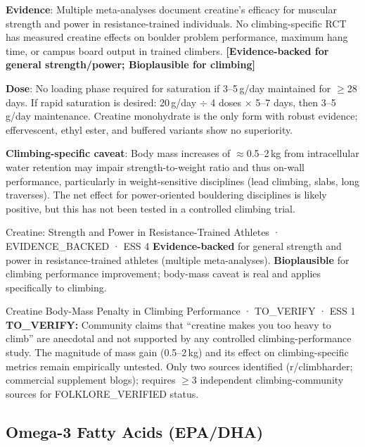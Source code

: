\textbf{Evidence}: Multiple meta-analyses document creatine's efficacy for muscular strength and power in resistance-trained individuals. No climbing-specific RCT has measured creatine effects on boulder problem performance, maximum hang time, or campus board output in trained climbers. \textbf{[Evidence-backed for general strength/power; Bioplausible for climbing]}

\textbf{Dose}: No loading phase required for saturation if 3--5\,g/day maintained for $\geq$28 days. If rapid saturation is desired: 20\,g/day $\div$ 4 doses $\times$ 5--7 days, then 3--5\,g/day maintenance. Creatine monohydrate is the only form with robust evidence; effervescent, ethyl ester, and buffered variants show no superiority.

\textbf{Climbing-specific caveat}: Body mass increases of ${\approx}$0.5--2\,kg from intracellular water retention may impair strength-to-weight ratio and thus on-wall performance, particularly in weight-sensitive disciplines (lead climbing, slabs, long traverses). The net effect for power-oriented bouldering disciplines is likely positive, but this has not been tested in a controlled climbing trial.

\begin{evidencebox}{Creatine: Strength and Power in Resistance-Trained Athletes · EVIDENCE\_BACKED · ESS 4}
\textbf{Evidence-backed} for general strength and power in resistance-trained athletes (multiple meta-analyses). \textbf{Bioplausible} for climbing performance improvement; body-mass caveat is real and applies specifically to climbing.
\end{evidencebox}

\begin{toverifybox}{Creatine Body-Mass Penalty in Climbing Performance · TO\_VERIFY · ESS 1}
\textbf{TO\_VERIFY:} Community claims that ``creatine makes you too heavy to climb'' are anecdotal and not supported by any controlled climbing-performance study. The magnitude of mass gain (0.5--2\,kg) and its effect on climbing-specific metrics remain empirically untested. Only two sources identified (r/climbharder; commercial supplement blogs); requires $\geq$3 independent climbing-community sources for FOLKLORE\_VERIFIED status.
\end{toverifybox}

\subsection{Omega-3 Fatty Acids (EPA/DHA)}
\label{subsec:omega3}

